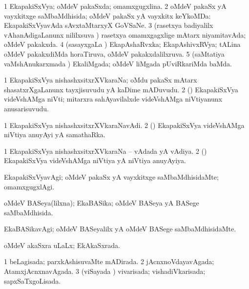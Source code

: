 \bentry 
{} 
\gl{\gu}
\expl{}
\bmng
\bnum
\num{1} EkapakiSxVya; oMdeV pakaSxda; omamxgugxlina. 
\num{2} oMdeV pakaSx yA vayxkitxge saMbaMdhisida; oMdeV pakaSx yA vayxkitx keYkoMDa:  EkapakiSxVyavAda sAvxtaMtarxyX GoVSaNe. 
\num{3} (rasetxya badiyalilx vAhanAdigaLanunx nililxsuva \vi) rasetxya omamxgagxlige mAtarx niyamitavAda; oMdeV pakakxda. 
\num{4} (sasayxgaLa \vi) EkapAshaRvxka; EkapAshivxRVya; tALina oMdeV pakakxdiMda horaTiruva, oMdeV pakakxdalilxruva. 
\num{5} (saMtatiya vaMshAnukarxmada \vi) EkaliMgada; oMdeV liMgada pUviRkariMda baMda. 
\enum
\emng
\eentry

\bentry
{} 
\gl{\nA}
\expl{}
\bmng
\bnum
\num{1} EkapakiSxVya nishashxsitxrXVkaraNa; oMdu pakaSx mAtarx shasatxrXgaLanunx tayxjisuvudu yA kaDime mADuvudu. 
\num{2} (\ame) EkapakiSxVya videVshAMga niVti; mitarxra sahAyavilalxde videVshAMga niVtiyanunx anusarisuvudu. 
\enum
\emng
\eentry

\bentry
{} 
\gl{\nA}
\expl{}
\bmng
\bnum
\num{1} EkapakiSxVya nishashxsitxrXVkaraNavAdi. 
\num{2} (\ame) EkapakiSxVya videVshAMga niVtiya anuyAyi yA samathaRka. 
\enum
\emng
\eentry

\bentry
{} 
\gl{\gu}
\expl{}
\bmng
\bnum
\num{1} EkapakiSxVya nishashxsitxrXVkaraNa -- vAdada yA vAdiya. 
\num{2} (\ame) EkapakiSxVya videVshAMga niVtiya yA niVtiya anuyAyiya. 
\enum
\emng
\eentry

\bentry
{} 
\gl{\kirxvi}
\expl{}
\bmng
EkapakiSxVyavAgi; oMdeV pakaSx yA vayxkitxge saMbaMdhisidaMte; omamxgugxlAgi. 
\emng
\eentry

\bentry
{} 
\gl{\gu}
\expl{}
\bmng
oMdeV BASeya(lilxna); EkaBASika; oMdeV BASeya yA BASege saMbaMdhisida. 
\emng
\eentry

\bentry
{} 
\gl{\kirxvi}
\expl{}
\bmng
EkaBASikavAgi; oMdeV BASeyalilx yA oMdeV BASege saMbaMdhisidaMte. 
\emng
\eentry

\bentry
{} 
\gl{\gu}
\expl{}
\bmng
oMdeV akaSxra uLaLx; EkAkaSxrada. 
\emng
\eentry

\bentry
{} 
\gl{\gu}
\expl{}
\bmng
\bnum
\num{1} beLagisada; parxkAshisuvaMte mADirada. 
\num{2} jAcnxnoVdayavAgada; AtamxjAcnxnavAgada. 
\num{3} (viSayada \vi) vivarisada; vishadiVkarisada; sapxSaTxgoLisada. 
\enum
\emng
\eentry

